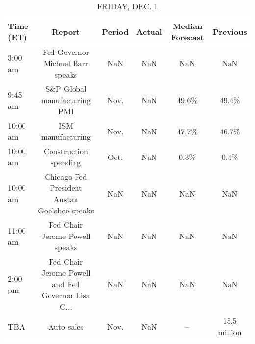 \documentclass{article}%
\begin{document}
\begin{table}[htbp]%
\caption{FRIDAY, DEC. 1}%
\centering%
\begin{adjustbox}{width=1\textwidth}%
\begin{tabular}{lccccc}
\toprule
Time (ET) &                                             Report & Period & Actual & Median Forecast &     Previous \\
\midrule
  3:00 am &                   Fed Governor Michael Barr speaks &    NaN &    NaN &             NaN &          NaN \\
  9:45 am &                       S\&P Global manufacturing PMI &   Nov. &    NaN &           49.6\% &        49.4\% \\
 10:00 am &                                  ISM manufacturing &   Nov. &    NaN &           47.7\% &        46.7\% \\
 10:00 am &                              Construction spending &   Oct. &    NaN &            0.3\% &         0.4\% \\
 10:00 am &       Chicago Fed President Austan Goolsbee speaks &    NaN &    NaN &             NaN &          NaN \\
 11:00 am &                     Fed Chair Jerome Powell speaks &    NaN &    NaN &             NaN &          NaN \\
  2:00 pm & Fed Chair Jerome Powell and Fed Governor Lisa C... &    NaN &    NaN &             NaN &          NaN \\
      TBA &                                         Auto sales &   Nov. &    NaN &              -- & 15.5 million \\
\bottomrule
\end{tabular}
%
\end{adjustbox}%
\end{table}
\end{document}
